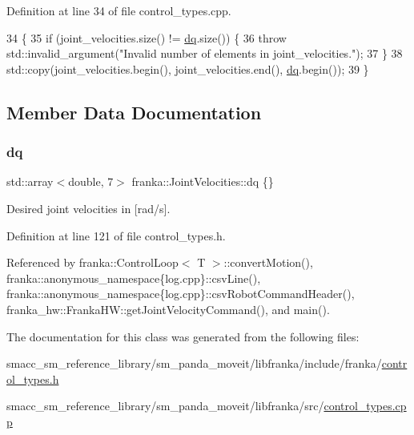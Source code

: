 Definition at line 34 of file control\+\_\+types.\+cpp.


\begin{DoxyCode}
34                                                                              \{
35   \textcolor{keywordflow}{if} (joint\_velocities.size() != \hyperlink{classfranka_1_1JointVelocities_a14fddb6fe7a7c4034dc82c283de8c2d3}{dq}.size()) \{
36     \textcolor{keywordflow}{throw} std::invalid\_argument(\textcolor{stringliteral}{"Invalid number of elements in joint\_velocities."});
37   \}
38   std::copy(joint\_velocities.begin(), joint\_velocities.end(), \hyperlink{classfranka_1_1JointVelocities_a14fddb6fe7a7c4034dc82c283de8c2d3}{dq}.begin());
39 \}
\end{DoxyCode}


\subsection{Member Data Documentation}
\mbox{\label{classfranka_1_1JointVelocities_a14fddb6fe7a7c4034dc82c283de8c2d3}} 
\subsubsection{\texorpdfstring{dq}{dq}}
{\footnotesize\ttfamily std\+::array$<$double, 7$>$ franka\+::\+Joint\+Velocities\+::dq \{\}}

Desired joint velocities in \mbox{[}rad/s\mbox{]}. 

Definition at line 121 of file control\+\_\+types.\+h.



Referenced by franka\+::\+Control\+Loop$<$ T $>$\+::convert\+Motion(), franka\+::anonymous\+\_\+namespace\{log.\+cpp\}\+::csv\+Line(), franka\+::anonymous\+\_\+namespace\{log.\+cpp\}\+::csv\+Robot\+Command\+Header(), franka\+\_\+hw\+::\+Franka\+H\+W\+::get\+Joint\+Velocity\+Command(), and main().



The documentation for this class was generated from the following files\+:\begin{DoxyCompactItemize}
\item 
smacc\+\_\+sm\+\_\+reference\+\_\+library/sm\+\_\+panda\+\_\+moveit/libfranka/include/franka/\hyperlink{control__types_8h}{control\+\_\+types.\+h}\item 
smacc\+\_\+sm\+\_\+reference\+\_\+library/sm\+\_\+panda\+\_\+moveit/libfranka/src/\hyperlink{control__types_8cpp}{control\+\_\+types.\+cpp}\end{DoxyCompactItemize}
